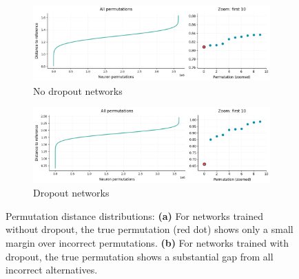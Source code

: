 \documentclass[11pt]{article}
\begin{document}
\begin{figure}[htbp]
\centering
\begin{subfigure}[b]{0.45\textwidth}
\centering
\includegraphics[width=\textwidth]{figures/perm_distances_no_dropout.png}
\caption{No dropout networks}
\label{fig:perm-no-dropout}
\end{subfigure}
\hfill
\begin{subfigure}[b]{0.45\textwidth}
\centering
\includegraphics[width=\textwidth]{figures/perm_distances_dropout.png}
\caption{Dropout networks}
\label{fig:perm-dropout}
\end{subfigure}
\caption{Permutation distance distributions: \textbf{(a)} For networks trained without dropout, the true permutation (red dot) shows only a small margin over incorrect permutations. \textbf{(b)} For networks trained with dropout, the true permutation shows a substantial gap from all incorrect alternatives.}
\label{fig:permutation-distances}
\end{figure}
\end{document}
